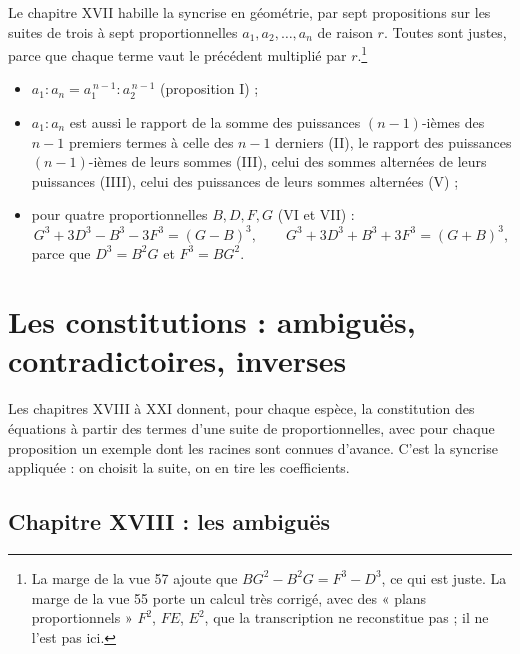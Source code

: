 \documentclass[11pt,a4paper]{article}
\begin{document}
Le chapitre XVII habille la syncrise en géométrie, par sept propositions sur les
suites de trois à sept proportionnelles $a_1, a_2, \ldots, a_n$ de raison $r$.
Toutes sont justes, parce que chaque terme vaut le précédent multiplié par
$r$.\footnote{La marge de la vue 57 ajoute que $BG^2 - B^2G = F^3 - D^3$, ce qui est
juste. La marge de la vue 55 porte un calcul très corrigé, avec des « plans
proportionnels » $F^2$, $FE$, $E^2$, que la transcription ne reconstitue pas ; il
ne l'est pas ici.}
\begin{itemize}
  \item $a_1 : a_n = a_1^{\,n-1} : a_2^{\,n-1}$ (proposition I) ;
  \item $a_1 : a_n$ est aussi le rapport de la somme des puissances
    $(n-1)$-ièmes des $n - 1$ premiers termes à celle des $n - 1$ derniers
    (II), le rapport des puissances $(n-1)$-ièmes de leurs sommes (III), celui
    des sommes alternées de leurs puissances (IIII), celui des puissances de
    leurs sommes alternées (V) ;
  \item pour quatre proportionnelles $B, D, F, G$ (VI et VII) :
    \[ G^3 + 3D^3 - B^3 - 3F^3 = (G - B)^3 , \qquad
       G^3 + 3D^3 + B^3 + 3F^3 = (G + B)^3 , \]
    parce que $D^3 = B^2G$ et $F^3 = BG^2$.
\end{itemize}

\section*{Les constitutions : ambiguës, contradictoires, inverses}

Les chapitres XVIII à XXI donnent, pour chaque espèce, la constitution des
équations à partir des termes d'une suite de proportionnelles, avec pour chaque
proposition un exemple dont les racines sont connues d'avance. C'est la
syncrise appliquée : on choisit la suite, on en tire les coefficients.

\subsection*{Chapitre XVIII : les ambiguës}
\end{document}
